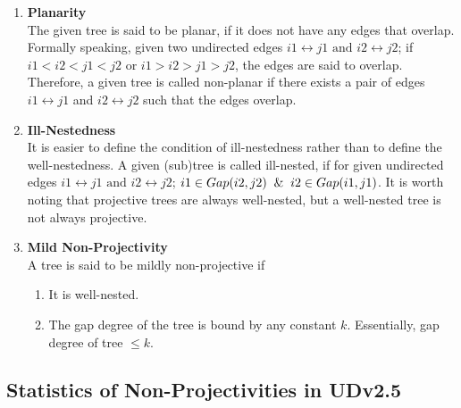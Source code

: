 \begin{enumerate}
    \item \textbf{Planarity}\\
    The given tree is said to be planar, if it does not have any edges that overlap. Formally speaking, given two undirected edges \(i1 \leftrightarrow j1 \text{ and } i2 \leftrightarrow j2\); if \(i1 < i2 < j1 < j2\) or \(i1 > i2 > j1 > j2\), the edges are said to overlap.
    Therefore, a given tree is called non-planar if there exists a pair of edges \(i1 \leftrightarrow j1\) and \(i2 \leftrightarrow j2\) such that the edges overlap.
    \item \textbf{Ill-Nestedness}\\
    It is easier to define the condition of ill-nestedness rather than to define the well-nestedness. A given (sub)tree is called ill-nested, if for given undirected edges \(i1 \leftrightarrow j1 \text{ and } i2 \leftrightarrow j2\); \(i1 \in Gap(i2,j2) \And i2 \in Gap(i1,j1)\). It is worth noting that projective trees are always well-nested, but a well-nested tree is not always projective.
    \item \textbf{Mild Non-Projectivity}\\
    A tree is said to be mildly non-projective if
    \begin{enumerate}
        \item It is well-nested.
        \item The gap degree of the tree is bound by any constant \(k\). Essentially, gap degree of tree \(\leq k\).
    \end{enumerate}
\end{enumerate}

\subsection{Statistics of Non-Projectivities in UDv2.5}

